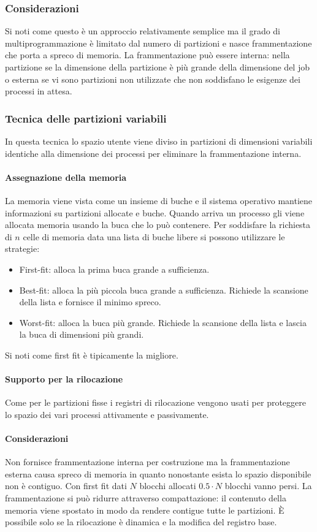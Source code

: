 \subsubsection{Considerazioni}
Si noti come questo \`e un approccio relativamente semplice ma il grado di multiprogrammazione \`e limitato dal numero di partizioni e nasce frammentazione che porta a spreco di memoria.
La frammentazione pu\`o essere interna: nella partizione se la dimensione della partizione \`e pi\`u grande della dimensione del job o esterna se vi sono partizioni non utilizzate
che non soddisfano le esigenze dei processi in attesa. 
\subsubsection{Tecnica delle partizioni variabili}
In questa tecnica lo spazio utente viene diviso in partizioni di dimensioni variabili identiche alla dimensione dei processi per eliminare la frammentazione interna. 
\paragraph{Assegnazione della memoria}
La memoria viene vista come un insieme di buche e il sistema operativo mantiene informazioni su partizioni allocate e buche. Quando arriva un processo gli viene allocata memoria usando
la buca che lo pu\`o contenere. Per soddisfare la richiesta di $n$ celle di memoria data una lista di buche libere si possono utilizzare le strategie:
\begin{itemize}
	\item First-fit: alloca la prima buca grande a sufficienza.
	\item Best-fit: alloca la pi\`u piccola buca grande a sufficienza. Richiede la scansione della lista e fornisce il minimo spreco.
	\item Worst-fit: alloca la buca pi\`u grande. Richiede la scansione della lista e lascia la buca di dimensioni pi\`u grandi.
\end{itemize}
Si noti come first fit \`e tipicamente la migliore. 	
\paragraph{Supporto per la rilocazione}
Come per le partizioni fisse i registri di rilocazione vengono usati per proteggere lo spazio dei vari processi attivamente e passivamente. 
\paragraph{Considerazioni}
Non fornisce frammentazione interna per costruzione ma la frammentazione esterna causa spreco di memoria in quanto nonostante esista lo spazio disponibile non \`e contiguo. Con first fit
dati $N$ blocchi allocati $0.5\cdot N$ blocchi vanno persi. La frammentazione si pu\`o ridurre attraverso compattazione: il contenuto della memoria viene spostato in modo da rendere
contigue tutte le partizioni. \`E possibile solo se la rilocazione \`e dinamica e la modifica del registro base. 
